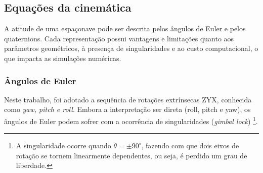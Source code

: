 \subsection{Equações da cinemática}
A atitude de uma espaçonave pode ser descrita pelos ângulos de Euler e pelos quaternions. 
Cada representação possui vantagens e limitações quanto aos parâmetros geométricos, à presença de singularidades e ao custo computacional, o que impacta as simulações numéricas.

\subsubsection{Ângulos de Euler}
Neste trabalho, foi adotado a sequência de rotações extrínsecas ZYX, conhecida como \emph{yaw, pitch e roll}.
Embora a interpretação ser direta (roll, pitch e yaw), os ângulos de Euler podem sofrer com a ocorrência de singularidades (\emph{gimbal lock})
\footnote{A singularidade ocorre quando $\theta = \pm 90^{\circ}$, fazendo com que dois eixos de rotação se tornem linearmente dependentes, ou seja, é perdido um grau de liberdade.}.


